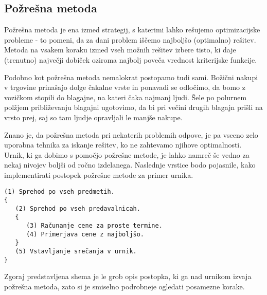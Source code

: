 \documentclass[a4paper,10pt]{article}
\begin{document}
\subsection{Požrešna metoda} %

Požrešna metoda je ena izmed strategij, s katerimi lahko rešujemo optimizacijske probleme -
to pomeni, da za dani problem iščemo najboljšo (optimalno) rešitev. Metoda na vsakem koraku
izmed vseh možnih rešitev izbere  tisto, ki daje (trenutno) največji dobiček oziroma najbolj
poveča vrednost kriterijske funkcije.

Podobno kot požrešna metoda nemalokrat postopamo tudi sami. Božični nakupi v trgovine
prinašajo dolge čakalne vrste in ponavadi se odločimo, da bomo z vozičkom stopili do blagajne,
na kateri čaka najmanj ljudi. Šele po polurnem polžjem približevanju blagajni ugotovimo,
da bi pri večini drugih blagajn prišli na vrsto prej, saj so tam ljudje opravljali le
manjše nakupe.

Znano je, da požrešna metoda pri nekaterih problemih odpove, je pa vseeno zelo uporabna
tehnika za iskanje rešitev, ko ne zahtevamo njihove optimalnosti. Urnik, ki ga dobimo s
pomočjo požrešne metode, je lahko namreč še vedno za nekaj nivojev boljši od ročno izdelanega.
Naslednje vrstice bodo pojasnile, kako implementirati postopek požrešne metode za primer urnika.

\begin{verbatim}
(1) Sprehod po vseh predmetih.
{
   (2) Sprehod po vseh predavalnicah.
   {
      (3) Računanje cene za proste termine.
      (4) Primerjava cene z najboljšo.
   }
   (5) Vstavljanje srečanja v urnik.
}
\end{verbatim}
%

Zgoraj predstavljena shema je le grob opis postopka, ki ga nad urnikom izvaja požrešna metoda,
zato si je smiselno podrobneje ogledati posamezne korake.
\end{document}
